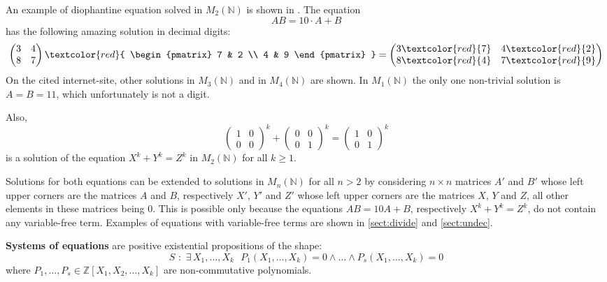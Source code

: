 \documentclass{article}
\theoremstyle{plain}
\theoremstyle{definition}
\begin{document}
An example of diophantine equation solved in $M_2(\mathbb N)$ is shown in \cite{Math1089}. The equation $$AB = 10 \cdot  A + B$$ has the following amazing solution in decimal digits:
$$
\begin{pmatrix}
3 & 4 \\ 8 & 7
\end{pmatrix}
\textcolor{red}
{
\begin{pmatrix}
7 & 2 \\ 4 & 9
\end{pmatrix}
} = 
\begin{pmatrix}
3\textcolor{red}{7} & 4\textcolor{red}{2} \\ 8\textcolor{red}{4} & 7\textcolor{red}{9}
\end{pmatrix}
$$
On the cited internet-site,  other solutions in $M_3(\mathbb N)$ and in $M_4(\mathbb N)$ are shown. In $M_1(\mathbb N)$ the only one non-trivial solution is $A = B = 11$, which unfortunately is not a digit. 

Also, 
$$
{\begin{pmatrix} 1 & 0 \\ 0 & 0 \end{pmatrix}}^k +  {\begin{pmatrix} 0 & 0 \\ 0 & 1 \end{pmatrix}}^k = {\begin{pmatrix} 1 & 0 \\ 0 & 1 \end{pmatrix}}^k 
$$
is a solution of the equation $X^k + Y^k = Z^k$ in $M_2(\mathbb N)$ for all $k \geq 1$. 


Solutions for both equations can be extended to solutions in $M_n(\mathbb N)$ for all $n >2$ by considering $n \times n$ matrices $A'$ and $B'$ whose left upper corners are the matrices $A$ and $B$, respectively $X'$, $Y'$ and $Z'$ whose left upper corners are the matrices $X$, $Y$ and $Z$, all other elements in these matrices being $0$. This is possible only because the equations $AB = 10A + B$, respectively $X^k + Y^k = Z^k$, do not contain any variable-free term. Examples of equations with variable-free terms are shown in \cref{sect:divide} and \cref{sect:undec}.

{\bf Systems of equations} are positive existential propositions of the shape:
$$ S \,\,:\,\,\exists \,X_1, \dots, X_k \,\,\,\,P_1(X_1, \dots, X_k) = 0 \wedge \dots \wedge P_s(X_1, \dots, X_k) = 0$$
where $P_1, \dots, P_s \in \mathbb Z[X_1, X_2, \dots, X_k]$ are non-commutative polynomials.
\end{document}
